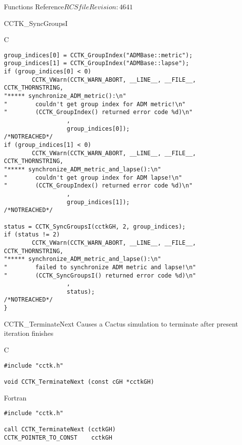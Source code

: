 \begin{cactuspart}{ Functions Reference}{$RCSfile$}{$Revision: 4641 $}
\begin{FunctionDescription}{CCTK\_SyncGroupsI}
\begin{ExampleSection}
\begin{Example}{C}
\begin{verbatim}
group_indices[0] = CCTK_GroupIndex("ADMBase::metric");
group_indices[1] = CCTK_GroupIndex("ADMBase::lapse");
if (group_indices[0] < 0)
        CCTK_VWarn(CCTK_WARN_ABORT, __LINE__, __FILE__, CCTK_THORNSTRING,
"***** synchronize_ADM_metric():\n"
"        couldn't get group index for ADM metric!\n"
"        (CCTK_GroupIndex() returned error code %d)\n"
                  ,
                  group_indices[0]);                            /*NOTREACHED*/
if (group_indices[1] < 0)
        CCTK_VWarn(CCTK_WARN_ABORT, __LINE__, __FILE__, CCTK_THORNSTRING,
"***** synchronize_ADM_metric_and_lapse():\n"
"        couldn't get group index for ADM lapse!\n"
"        (CCTK_GroupIndex() returned error code %d)\n"
                  ,
                  group_indices[1]);                            /*NOTREACHED*/

status = CCTK_SyncGroupsI(cctkGH, 2, group_indices);
if (status != 2)
        CCTK_VWarn(CCTK_WARN_ABORT, __LINE__, __FILE__, CCTK_THORNSTRING,
"***** synchronize_ADM_metric_and_lapse():\n"
"        failed to synchronize ADM metric and lapse!\n"
"        (CCTK_SyncGroupsI() returned error code %d)\n"
                  ,
                  status);                                 /*NOTREACHED*/
}
\end{verbatim}
\end{Example}
\end{ExampleSection}
\end{FunctionDescription}





\begin{FunctionDescription}{CCTK\_TerminateNext}
\label{CCTK-TerminateNext}
Causes a Cactus simulation to terminate after present iteration finishes

\begin{SynopsisSection}
\begin{Synopsis}{C}
\begin{verbatim}
#include "cctk.h"

void CCTK_TerminateNext (const cGH *cctkGH)
\end{verbatim}
\end{Synopsis}
\begin{Synopsis}{Fortran}
\begin{verbatim}
#include "cctk.h"

call CCTK_TerminateNext (cctkGH)
CCTK_POINTER_TO_CONST    cctkGH
\end{verbatim}
\end{Synopsis}
\end{SynopsisSection}


\end{FunctionDescription}
\end{cactuspart}
